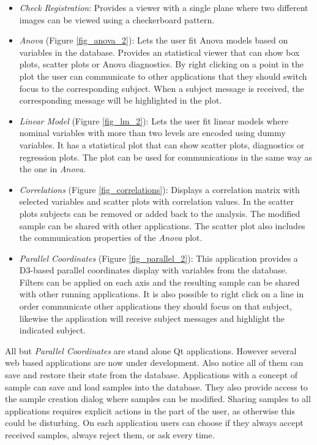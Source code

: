 \begin{itemize}
\item \emph{Check Registration}: Provides a viewer with a single plane where two different images can be viewed using a checkerboard pattern.

\item \emph{Anova} (Figure \ref{fig_anova_2}): Lets the user fit Anova models based on variables in the database. Provides an statistical viewer that can show box plots, scatter plots or Anova diagnostics. By right clicking on a point in the plot the user can communicate to other applications that they should switch focus to the corresponding subject. When a subject message is received, the corresponding message will be highlighted in the plot.

\item \emph{Linear Model} (Figure \ref{fig_lm_2}): Lets the user fit linear models where nominal variables with more than two levels are encoded using dummy variables. It has a statistical plot that can show scatter plots, diagnostics or regression plots. The plot can be used for communications in the same way as the one in \emph{Anova}.

\item \emph{Correlations} (Figure \ref{fig_correlations}): Displays a correlation matrix with selected variables and scatter plots with correlation values. In the scatter plots subjects can be removed or added back to the analysis. The modified sample can be shared with other applications. The scatter plot also includes the communication properties of the \emph{Anova} plot.

\item \emph{Parallel Coordinates} (Figure \ref{fig_parallel_2}): This application provides a D3-based parallel coordinates display with variables from the database. Filters can be applied on each axis and the resulting sample can be shared with other running applications. It is also possible to right click on a line in order communicate other applications they should focus on that subject, likewise the application will receive subject messages and highlight the indicated subject.

\end{itemize}

All but \emph{Parallel Coordinates} are stand alone Qt applications. However several web based applications are now under development. Also notice all of them can save and restore their state from the database. Applications with a concept of sample can save and load samples into the database. They also provide access to the sample creation dialog where samples can be modified. Sharing samples to all applications requires explicit actions in the part of the user, as otherwise this could be disturbing. On each application users can choose if they always accept received samples, always reject them, or ask every time.

